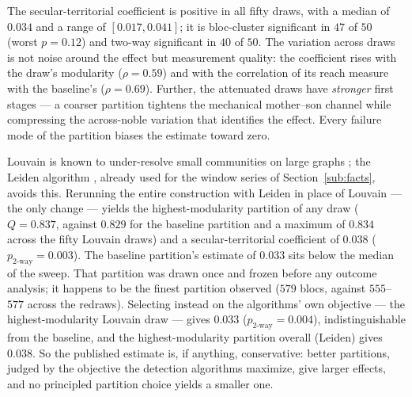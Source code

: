\documentclass[12pt]{article}
\theoremstyle{definition}
\theoremstyle{remark}
\begin{document}
The secular-territorial coefficient is positive in all fifty draws, with a
median of $0.034$ and a range of $[0.017, 0.041]$; it is bloc-cluster
significant in $47$ of $50$ (worst $p = 0.12$) and two-way significant in
$40$ of $50$. The variation across draws is not noise around the effect but
measurement quality: the coefficient rises with the draw's modularity
($\rho = 0.59$) and with the correlation of its reach measure with the
baseline's ($\rho = 0.69$). Further, the attenuated draws have
\emph{stronger} first stages --- a coarser partition tightens the
mechanical mother--son channel while compressing the across-noble
variation that identifies the effect. Every failure mode of the partition
biases the estimate toward zero.

Louvain is known to under-resolve small communities on large graphs
\citep{fortunato_barthelemy_2007}; the Leiden algorithm
\citep{traag_2019}, already used for the window series of
Section~\ref{sub:facts}, avoids this. Rerunning the entire construction
with Leiden in place of Louvain --- the only change --- yields the
highest-modularity partition of any draw ($Q = 0.837$, against $0.829$ for
the baseline partition and a maximum of $0.834$ across the fifty Louvain
draws) and a secular-territorial coefficient of $0.038$
($p_{\text{2-way}} = 0.003$). The baseline partition's estimate of $0.033$
sits below the median of the sweep. That partition was drawn once and
frozen before any outcome analysis; it happens to be the finest partition
observed ($579$ blocs, against $555$--$577$ across the redraws). Selecting
instead on the algorithms' own objective --- the highest-modularity
Louvain draw --- gives $0.033$ ($p_{\text{2-way}} = 0.004$),
indistinguishable from the baseline, and the highest-modularity partition
overall (Leiden) gives $0.038$. So the published estimate is, if anything,
conservative: better partitions, judged by the objective the detection
algorithms maximize, give larger effects, and no principled partition
choice yields a smaller one.
\end{document}
